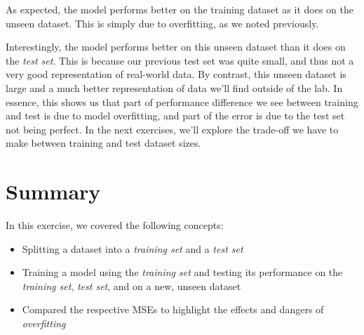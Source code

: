 \documentclass[11pt]{article}
\providecommand{\tightlist}{%
      \setlength{\itemsep}{0pt}\setlength{\parskip}{0pt}}
\begin{document}
    As expected, the model performs better on the training dataset as it
does on the unseen dataset. This is simply due to overfitting, as we
noted previously.

Interestingly, the model performs better on this unseen dataset than it
does on the \emph{test set}. This is because our previous test set was
quite small, and thus not a very good representation of real-world data.
By contrast, this unseen dataset is large and a much better
representation of data we'll find outside of the lab. In essence, this
shows us that part of performance difference we see between training and
test is due to model overfitting, and part of the error is due to the
test set not being perfect. In the next exercises, we'll explore the
trade-off we have to make between training and test dataset sizes.

\hypertarget{summary}{%
\section{Summary}\label{summary}}

In this exercise, we covered the following concepts:

\begin{itemize}
\tightlist
\item
  Splitting a dataset into a \emph{training set} and a \emph{test set}
\item
  Training a model using the \emph{training set} and testing its
  performance on the \emph{training set}, \emph{test set}, and on a new,
  unseen dataset
\item
  Compared the respective MSEs to highlight the effects and dangers of
  \emph{overfitting}
\end{itemize}


    
    
    
\end{document}

